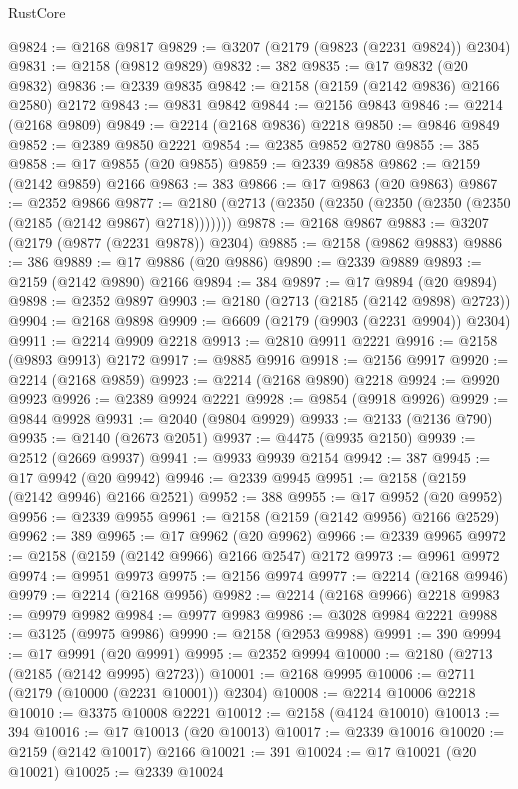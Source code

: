 \begin{lexlean}{RustCore}
\begin{coremodule}
@9824 := @2168 @9817
@9829 := @3207 (@2179 (@9823 (@2231 @9824)) @2304)
@9831 := @2158 (@9812 @9829)
@9832 := 382
@9835 := @17 @9832 (@20 @9832)
@9836 := @2339 @9835
@9842 := @2158 (@2159 (@2142 @9836) @2166 @2580) @2172
@9843 := @9831 @9842
@9844 := @2156 @9843
@9846 := @2214 (@2168 @9809)
@9849 := @2214 (@2168 @9836) @2218
@9850 := @9846 @9849
@9852 := @2389 @9850 @2221
@9854 := @2385 @9852 @2780
@9855 := 385
@9858 := @17 @9855 (@20 @9855)
@9859 := @2339 @9858
@9862 := @2159 (@2142 @9859) @2166
@9863 := 383
@9866 := @17 @9863 (@20 @9863)
@9867 := @2352 @9866
@9877 := @2180 (@2713 (@2350 (@2350 (@2350 (@2350 (@2350 (@2185 (@2142 @9867) @2718)))))))
@9878 := @2168 @9867
@9883 := @3207 (@2179 (@9877 (@2231 @9878)) @2304)
@9885 := @2158 (@9862 @9883)
@9886 := 386
@9889 := @17 @9886 (@20 @9886)
@9890 := @2339 @9889
@9893 := @2159 (@2142 @9890) @2166
@9894 := 384
@9897 := @17 @9894 (@20 @9894)
@9898 := @2352 @9897
@9903 := @2180 (@2713 (@2185 (@2142 @9898) @2723))
@9904 := @2168 @9898
@9909 := @6609 (@2179 (@9903 (@2231 @9904)) @2304)
@9911 := @2214 @9909 @2218
@9913 := @2810 @9911 @2221
@9916 := @2158 (@9893 @9913) @2172
@9917 := @9885 @9916
@9918 := @2156 @9917
@9920 := @2214 (@2168 @9859)
@9923 := @2214 (@2168 @9890) @2218
@9924 := @9920 @9923
@9926 := @2389 @9924 @2221
@9928 := @9854 (@9918 @9926)
@9929 := @9844 @9928
@9931 := @2040 (@9804 @9929)
@9933 := @2133 (@2136 @790)
@9935 := @2140 (@2673 @2051)
@9937 := @4475 (@9935 @2150)
@9939 := @2512 (@2669 @9937)
@9941 := @9933 @9939 @2154
@9942 := 387
@9945 := @17 @9942 (@20 @9942)
@9946 := @2339 @9945
@9951 := @2158 (@2159 (@2142 @9946) @2166 @2521)
@9952 := 388
@9955 := @17 @9952 (@20 @9952)
@9956 := @2339 @9955
@9961 := @2158 (@2159 (@2142 @9956) @2166 @2529)
@9962 := 389
@9965 := @17 @9962 (@20 @9962)
@9966 := @2339 @9965
@9972 := @2158 (@2159 (@2142 @9966) @2166 @2547) @2172
@9973 := @9961 @9972
@9974 := @9951 @9973
@9975 := @2156 @9974
@9977 := @2214 (@2168 @9946)
@9979 := @2214 (@2168 @9956)
@9982 := @2214 (@2168 @9966) @2218
@9983 := @9979 @9982
@9984 := @9977 @9983
@9986 := @3028 @9984 @2221
@9988 := @3125 (@9975 @9986)
@9990 := @2158 (@2953 @9988)
@9991 := 390
@9994 := @17 @9991 (@20 @9991)
@9995 := @2352 @9994
@10000 := @2180 (@2713 (@2185 (@2142 @9995) @2723))
@10001 := @2168 @9995
@10006 := @2711 (@2179 (@10000 (@2231 @10001)) @2304)
@10008 := @2214 @10006 @2218
@10010 := @3375 @10008 @2221
@10012 := @2158 (@4124 @10010)
@10013 := 394
@10016 := @17 @10013 (@20 @10013)
@10017 := @2339 @10016
@10020 := @2159 (@2142 @10017) @2166
@10021 := 391
@10024 := @17 @10021 (@20 @10021)
@10025 := @2339 @10024

\end{coremodule}
\end{lexlean}
